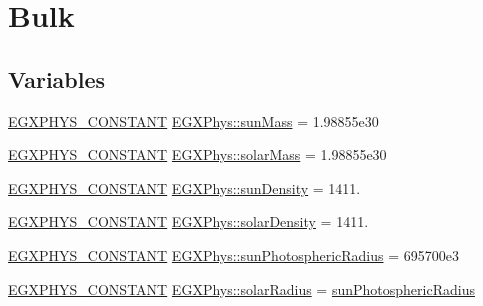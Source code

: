 \hypertarget{group___e_g_x_phys-_constants-_astrophysics-_solar_system-_sun-_bulk}{}\section{Bulk}
\label{group___e_g_x_phys-_constants-_astrophysics-_solar_system-_sun-_bulk}
\subsection*{Variables}
\begin{DoxyCompactItemize}
\item 
\mbox{\hyperlink{group___e_g_x_phys-_constants-_macros_ga76980d288494ce1714c9ac68a95ba702}{E\+G\+X\+P\+H\+Y\+S\+\_\+\+C\+O\+N\+S\+T\+A\+NT}} \mbox{\hyperlink{group___e_g_x_phys-_constants-_astrophysics-_solar_system-_sun-_bulk_ga4b0d14718fcf75def83eec7f17d86268}{E\+G\+X\+Phys\+::sun\+Mass}} = 1.\+98855e30
\item 
\mbox{\hyperlink{group___e_g_x_phys-_constants-_macros_ga76980d288494ce1714c9ac68a95ba702}{E\+G\+X\+P\+H\+Y\+S\+\_\+\+C\+O\+N\+S\+T\+A\+NT}} \mbox{\hyperlink{group___e_g_x_phys-_constants-_astrophysics-_solar_system-_sun-_bulk_gac1786f38c6e150937d1c83e4aa499a58}{E\+G\+X\+Phys\+::solar\+Mass}} = 1.\+98855e30
\item 
\mbox{\hyperlink{group___e_g_x_phys-_constants-_macros_ga76980d288494ce1714c9ac68a95ba702}{E\+G\+X\+P\+H\+Y\+S\+\_\+\+C\+O\+N\+S\+T\+A\+NT}} \mbox{\hyperlink{group___e_g_x_phys-_constants-_astrophysics-_solar_system-_sun-_bulk_gacee8979e95c926008206cc47c4cdc809}{E\+G\+X\+Phys\+::sun\+Density}} = 1411.
\item 
\mbox{\hyperlink{group___e_g_x_phys-_constants-_macros_ga76980d288494ce1714c9ac68a95ba702}{E\+G\+X\+P\+H\+Y\+S\+\_\+\+C\+O\+N\+S\+T\+A\+NT}} \mbox{\hyperlink{group___e_g_x_phys-_constants-_astrophysics-_solar_system-_sun-_bulk_gad529e58b7a92599270e10726d55b72c2}{E\+G\+X\+Phys\+::solar\+Density}} = 1411.
\item 
\mbox{\hyperlink{group___e_g_x_phys-_constants-_macros_ga76980d288494ce1714c9ac68a95ba702}{E\+G\+X\+P\+H\+Y\+S\+\_\+\+C\+O\+N\+S\+T\+A\+NT}} \mbox{\hyperlink{group___e_g_x_phys-_constants-_astrophysics-_solar_system-_sun-_bulk_gac257be308fa17adaf47f3310c5c65377}{E\+G\+X\+Phys\+::sun\+Photospheric\+Radius}} = 695700e3
\item 
\mbox{\hyperlink{group___e_g_x_phys-_constants-_macros_ga76980d288494ce1714c9ac68a95ba702}{E\+G\+X\+P\+H\+Y\+S\+\_\+\+C\+O\+N\+S\+T\+A\+NT}} \mbox{\hyperlink{group___e_g_x_phys-_constants-_astrophysics-_solar_system-_sun-_bulk_gaa98fc533653b96e0ae42262027723d6c}{E\+G\+X\+Phys\+::solar\+Radius}} = \mbox{\hyperlink{group___e_g_x_phys-_constants-_astrophysics-_solar_system-_sun-_bulk_gac257be308fa17adaf47f3310c5c65377}{sun\+Photospheric\+Radius}}

\end{DoxyCompactItemize}
